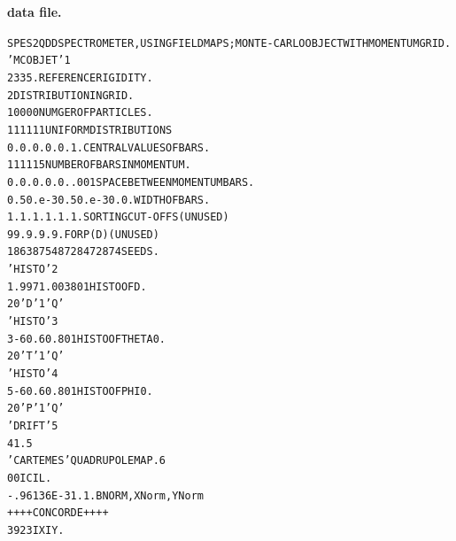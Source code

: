 \begin{tiny}
\begin{center}
\twocolumn

\noindent \textbf{\normalsize \zgoubi data file.}

\begin{alltt}
SPES2 QDD SPECTROMETER, USING FIELD MAPS; MONTE-CARLO OBJECT WITH MOMENTUM GRID.
 'MCOBJET'                                                                    1
 2335.                                REFERENCE  RIGIDITY.                      
 2                                    DISTRIBUTION  IN  GRID.                   
 10000                                NUMGER  OF  PARTICLES.                    
 1   1   1   1   1   1                UNIFORM DISTRIBUTIONS                     
 0.  0.  0.  0.  0.  1.               CENTRAL  VALUES  OF  BARS.                
 1   1   1   1   1   5                NUMBER  OF  BARS  IN  MOMENTUM.           
 0.  0.  0.  0.  0.  .001             SPACE  BETWEEN  MOMENTUM  BARS.           
 0.  50.e-3 0.  50.e-3 0.  0.         WIDTH  OF  BARS.                          
 1.  1.  1.  1.  1.  1.               SORTING CUT-OFFS (UNUSED)                 
 9   9. 9. 9. 9.                      FOR P(D) (UNUSED)                         
 186387 548728 472874                 SEEDS.                                    
  'HISTO'                                                                     2
  1   .997   1.003  80  1             HISTO  OF  D.                             
  20  'D'  1  'Q'                                                               
  'HISTO'                                                                     3
  3   -60.  60.     80  1             HISTO  OF  THETA0.                        
  20  'T'  1  'Q'                                                             
  'HISTO'                                                                     4
  5   -60.  60.     80  1             HISTO  OF  PHI0.                          
  20  'P'  1  'Q'                                                               
 'DRIFT'                                                                      5
 41.5                                                                           
 'CARTEMES'                           QUADRUPOLE  MAP.                        6
  0  0                                IC  IL.                                   
  -.96136E-3  1. 1.                   BNORM, XNorm,YNorm                        
 ++++  CONCORDE ++++                                                            
  39  23                              IX  IY.                                   

\end{alltt}
\end{center}
\end{tiny}
